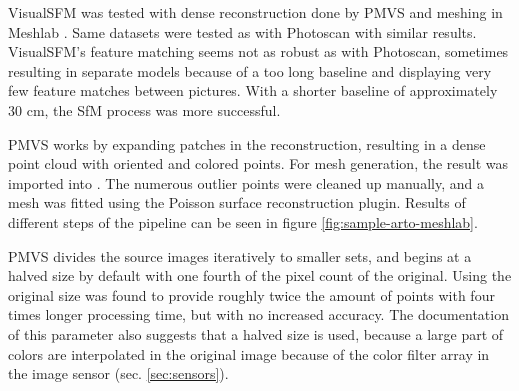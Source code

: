 



VisualSFM \cite{visualsfm} was tested with dense reconstruction done by PMVS \cite{pmvs} and meshing in Meshlab \cite{meshlab}.
Same datasets were tested as with Photoscan with similar results.
VisualSFM's feature matching seems not as robust as with Photoscan, sometimes resulting in separate models because of a too long baseline and displaying very few feature matches between pictures.
With a shorter baseline of approximately 30 cm, the SfM process was more successful.

PMVS \cite{pmvs} works by expanding patches in the reconstruction, resulting in a dense point cloud with oriented and colored points.
For mesh generation, the result was imported into \cite{Meshlab}.
The numerous outlier points were cleaned up manually, and a mesh was fitted using the Poisson surface reconstruction plugin.
Results of different steps of the pipeline can be seen in figure \ref{fig:sample-arto-meshlab}.

PMVS divides the source images iteratively to smaller sets, and begins at a halved size by default with one fourth of the pixel count of the original.
Using the original size was found to provide roughly twice the amount of points with four times longer processing time, but with no increased accuracy.
The documentation of this parameter also suggests that a halved size is used, because a large part of colors are interpolated in the original image because of the color filter array in the image sensor (sec. \ref{sec:sensors}).

